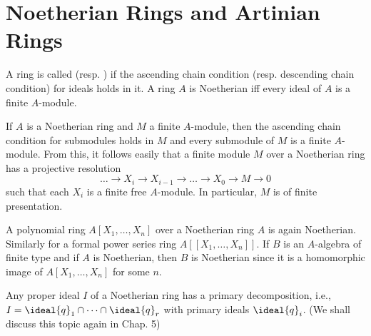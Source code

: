 \documentclass[../main]{subfiles}
\begin{document}
\section{Noetherian Rings and Artinian Rings}\label{sec:02}
\newparagraph
A ring is called  (resp. ) if the ascending chain condition (resp. descending chain condition) for ideals holds in it. A ring $A$ is Noetherian iff every ideal of $A$ is a finite $A$-module.

If $A$ is a Noetherian ring and $M$ a finite $A$-module, then the ascending chain condition for submodules holds in $M$ and every submodule of $M$ is a finite $A$-module. From this, it follows easily that a finite module $M$ over a Noetherian ring has a projective resolution \[\dots\longrightarrow X_i\longrightarrow X_{i-1}\longrightarrow\dots\longrightarrow X_0\longrightarrow M\longrightarrow 0\]such that each $X_i$ is a finite free $A$-module. In particular, $M$ is of finite presentation.

A polynomial ring $A[X_1,\dots,X_n]$ over a Noetherian ring $A$ is again Noetherian. Similarly for a formal power series ring $A[[X_1,\dots,X_n]]$. If $B$ is an $A$-algebra of finite type and if $A$ is Noetherian, then $B$ is Noetherian since it is a homomorphic image of $A[X_1,\dots,X_n]$ for some $n$.

\newparagraph
Any proper ideal $I$ of a Noetherian ring has a primary decomposition, i.e., $I=\ideal{q}_1\cap\cdots\cap \ideal{q}_r$ with primary ideals $\ideal{q}_i$. (We shall discuss this topic again in Chap. 5)
\end{document}
